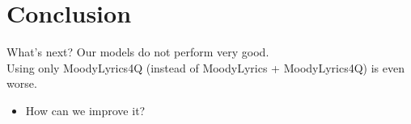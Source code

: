 \documentclass[xcolor=dvipsnames]{beamer}
\begin{document}
\section{Conclusion}

\begin{frame}{What's next?}
Our models do not perform very good. \\
Using only MoodyLyrics4Q (instead of MoodyLyrics + MoodyLyrics4Q) is even worse. 
\begin{itemize}
\item How can we improve it? 
\end{itemize}
\end{frame}



\end{document}
